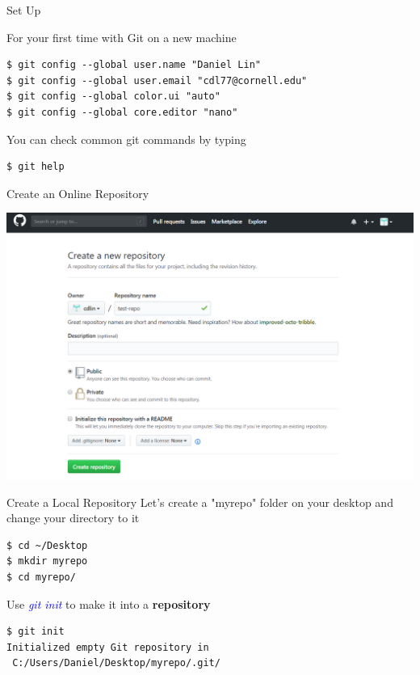 \documentclass[11pt]{beamer}
\begin{document}
\begin{frame}[fragile]{Set Up}

For your first time with Git on a new machine
\begin{lstlisting}
$ git config --global user.name "Daniel Lin"
$ git config --global user.email "cdl77@cornell.edu"
$ git config --global color.ui "auto"
$ git config --global core.editor "nano"
\end{lstlisting}

You can check common git commands by typing
\begin{lstlisting}
$ git help
\end{lstlisting}
\end{frame}
\begin{frame}[fragile]{Create an Online Repository}
\begin{center}
	\includegraphics[width=1.0\textwidth]{./auxfiles/github_repo.png}
\end{center}
\end{frame}
\begin{frame}[fragile]{Create a Local Repository}
Let's create a "myrepo" folder on your desktop and change your directory to it
\begin{lstlisting}
$ cd ~/Desktop
$ mkdir myrepo
$ cd myrepo/
\end{lstlisting}
Use \textcolor{blue}{\emph{git init}} to make it into a \textbf{repository}
\begin{lstlisting}
$ git init
Initialized empty Git repository in
 C:/Users/Daniel/Desktop/myrepo/.git/
\end{lstlisting}
\end{frame}
\end{document}
